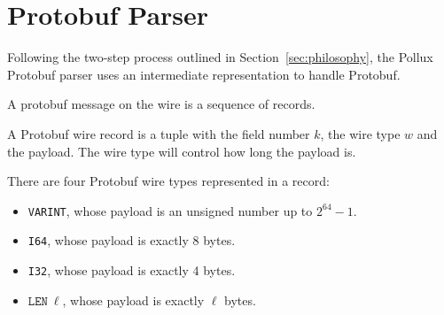 \section{Protobuf Parser}\label{sec:proto-parse}

Following the two-step process outlined in Section~\ref{sec:philosophy}, the
Pollux Protobuf parser uses an intermediate representation to handle Protobuf.

A protobuf message on the wire is a sequence of records.

\vspace{1em}
\begin{definition}
  A Protobuf wire record is a tuple with the field number $k$, the wire type $w$
  and the payload. The wire type will control how long the payload is.
\end{definition}

\vspace{1em}
\begin{definition}
  There are four Protobuf wire types represented in a record:
  \begin{itemize}
  \item \texttt{VARINT}, whose payload is an unsigned number up to $2^{64} - 1$.
  \item \texttt{I64}, whose payload is exactly 8 bytes.
  \item \texttt{I32}, whose payload is exactly 4 bytes.
  \item $\mathtt{LEN}\ \ell$, whose payload is exactly $\ell$ bytes.
  \end{itemize}
\end{definition}


